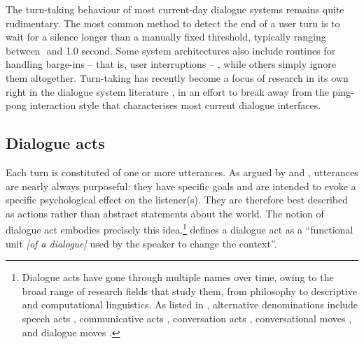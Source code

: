 The turn-taking behaviour of most current-day dialogue systems remains quite rudimentary.  The most common method to detect the end of a user turn is to wait for a silence longer than a manually fixed threshold, typically ranging between 
\textonehalf  $ $ and 1.0 second.  Some system architectures also include routines for handling barge-ins -- that is, user interruptions --  \citep{StromS00}, while others simply ignore them altogether. Turn-taking has recently become a focus of research in its own right in the dialogue system literature \citep{RauxE09,Gravano2011}, in an effort to break away from the ping-pong interaction style that characterises most current dialogue interfaces.  

\subsection{Dialogue acts}

Each turn is constituted of one or more utterances.  As argued by \cite{Austin1962} and \cite{Searle1969}, utterances are nearly always purposeful: they have specific goals and are intended to evoke a specific psychological effect on the listener(s).  They are therefore best described as actions rather than abstract statements about the world.  The notion of dialogue act embodies precisely this idea.\footnote{Dialogue acts have gone through multiple names over time, owing to the broad range of research fields that study them, from philosophy to descriptive and computational linguistics.  As listed in \cite{mctear2004}, alternative denominations include speech acts \citep{Searle1969}, communicative acts \citep{allwood1976}, conversation acts \citep{TraumH92}, conversational moves \citep{sinclair1975}, and dialogue moves \citep{Larsson:2000}.} \cite[][p.~5]{Bunt1996} defines a dialogue act as a ``functional unit \textit{[of a dialogue]} used by the speaker to change the context''.

